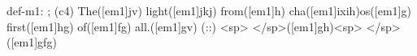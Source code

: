 def-m1: \grealign;
(c4) The([em1]jv) light([em1]jkj) from([em1]h) cha([em1]ixih)os([em1]g) first([em1]hg) of([em1]fg) all.([em1]gv) (::) <sp> </sp>([em1]gh)<sp>   </sp>([em1]gfg)